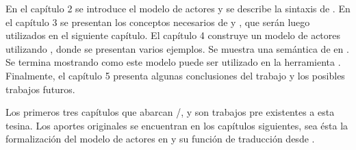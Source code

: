 En el capítulo 2 se introduce el modelo de actores y se describe la sintaxis de \SAL. En el capítulo 3 se presentan los conceptos necesarios de \CSP y \CSPm, que serán luego utilizados en el siguiente capítulo. El capítulo 4 construye un modelo de actores utilizando \CSP, donde se presentan varios ejemplos. Se muestra una semántica de \SAL en \CSP. Se termina mostrando como este modelo puede ser utilizado en la herramienta \FDR. Finalmente, el capítulo 5 presenta algunas conclusiones del trabajo y los posibles trabajos futuros.

Los primeros tres capítulos que abarcan \FDR/\CSPm, \CSP y \SAL son trabajos pre existentes a esta tesina. Los aportes originales se encuentran en los capítulos siguientes, sea ésta la formalización del modelo de actores en \CSP y su función de traducción desde \SAL. 


